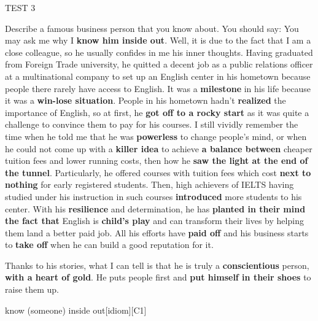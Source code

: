 \begin{glossarymc}[Cambridge 15]
\begin{test}{TEST 3}
\begin{qa}{Describe a famous business person that you know about. You should say:}
    You may ask me why I \textbf{know him inside out}. Well, it is due to the fact that I am a close colleague, so he usually confides in me his inner thoughts. Having graduated from Foreign Trade university, he quitted a decent job as a public relations officer at a multinational company to set up an English center in his hometown because people there rarely have access to English. It was a \textbf{milestone} in his life because it was a \textbf{win-lose situation}. People in his hometown hadn’t \textbf{realized} the importance of English, so at first, he \textbf{got off to a rocky start} as it was quite a challenge to convince them to pay for his courses. I still vividly remember the time when he told me that he was \textbf{powerless} to change people’s mind, or when he could not come up with a \textbf{killer idea} to achieve \textbf{a balance between} cheaper tuition fees and lower running costs, then how he \textbf{saw the light at the end of the tunnel}. Particularly, he offered courses with tuition fees which cost \textbf{next to nothing} for early registered students. Then, high achievers of IELTS having studied under his instruction in such courses \textbf{introduced} more students to his center. With his \textbf{resilience} and determination, he has \textbf{planted in their mind the fact that} English is \textbf{child’s play} and can transform their lives by helping them land a better paid job. All his efforts have \textbf{paid off} and his business starts to \textbf{take off} when he can build a good reputation for it.

    Thanks to his stories, what I can tell is that he is truly a \textbf{conscientious} person, \textbf{with a heart of gold}. He puts people first and \textbf{put himself in their shoes} to raise them up.
    \end{qa}

        \begin{VocabExplain}[Part 2]
            \begin{ExplainCard}{know (someone) inside out}[idiom][C1]
            \end{ExplainCard}


\end{VocabExplain}
\end{test}
\end{glossarymc}
